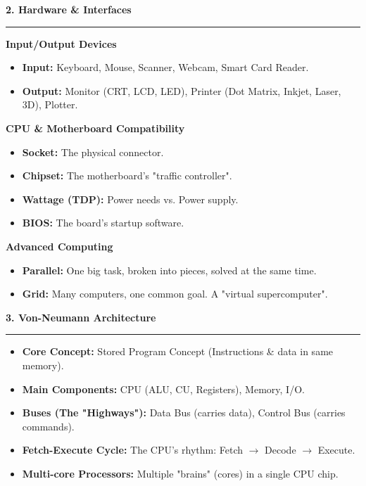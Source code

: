 \documentclass[a4paper, 8pt]{extarticle}
\newcommand{\sectionheading}[1]{\large\textbf{#1}\par\noindent\rule{\linewidth}{0.4pt}}
\newcommand{\subsectionheading}[1]{\normalsize\textbf{#1}}
\begin{document}
\begin{multicols}{2}
\vspace{1em}
\sectionheading{2. Hardware \& Interfaces}
\vspace{0.5em}
\subsectionheading{Input/Output Devices}
\begin{itemize}
    \item \textbf{Input:} Keyboard, Mouse, Scanner, Webcam, Smart Card Reader.
    \item \textbf{Output:} Monitor (CRT, LCD, LED), Printer (Dot Matrix, Inkjet, Laser, 3D), Plotter.
\end{itemize}
\subsectionheading{CPU \& Motherboard Compatibility}
\begin{itemize}
    \item \textbf{Socket:} The physical connector.
    \item \textbf{Chipset:} The motherboard's "traffic controller".
    \item \textbf{Wattage (TDP):} Power needs vs. Power supply.
    \item \textbf{BIOS:} The board's startup software.
\end{itemize}
\subsectionheading{Advanced Computing}
\begin{itemize}
    \item \textbf{Parallel:} One big task, broken into pieces, solved at the same time.
    \item \textbf{Grid:} Many computers, one common goal. A "virtual supercomputer".
\end{itemize}

\columnbreak %


\sectionheading{3. Von-Neumann Architecture}
\vspace{0.5em}
\begin{itemize}
    \item \textbf{Core Concept:} Stored Program Concept (Instructions \& data in same memory).
    \item \textbf{Main Components:} CPU (ALU, CU, Registers), Memory, I/O.
    \item \textbf{Buses (The "Highways"):} Data Bus (carries data), Control Bus (carries commands).
    \item \textbf{Fetch-Execute Cycle:} The CPU's rhythm: Fetch $\rightarrow$ Decode $\rightarrow$ Execute.
    \item \textbf{Multi-core Processors:} Multiple "brains" (cores) in a single CPU chip.
\end{itemize}


\end{multicols}
\end{document}
